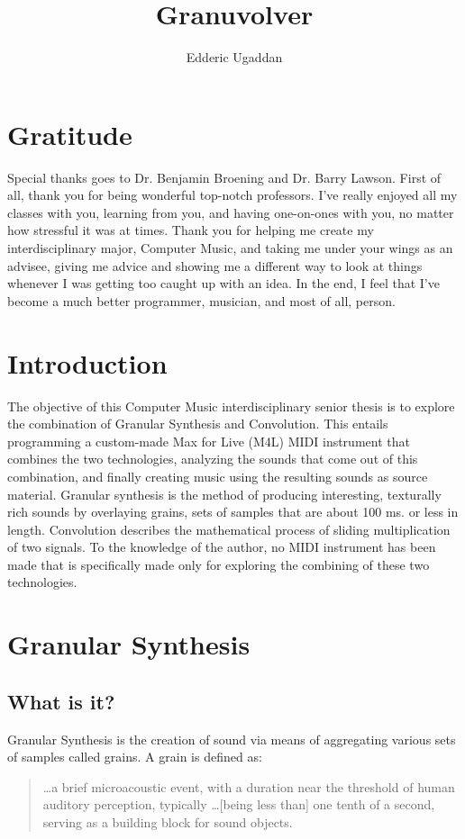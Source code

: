 \documentclass{article}
\author{Edderic Ugaddan}
\title{Granuvolver}
\begin{document}
	\maketitle
	\tableofcontents
	\section{Gratitude}

	Special thanks goes to Dr. Benjamin Broening and Dr. Barry Lawson. First of all, thank you for being wonderful top-notch professors. I've really enjoyed all my classes with you, learning from you, and having one-on-ones with you, no matter how stressful it was at times. Thank you for helping me create my interdisciplinary major, Computer Music, and taking me under your wings as an advisee, giving me advice and showing me a different way to look at things whenever I was getting too caught up with an idea.  In the end, I feel that I've become a much better programmer, musician, and most of all, person.

	\section{Introduction}

	The objective of this Computer Music interdisciplinary senior thesis is to explore the combination of Granular Synthesis and Convolution. This entails programming a custom-made Max for Live (M4L) MIDI instrument that combines the two technologies, analyzing the sounds that come out of this combination, and finally creating music using the resulting sounds as source material. Granular synthesis is the method of producing interesting, texturally rich sounds by overlaying grains, sets of samples that are about 100 ms. or less in length. Convolution describes the mathematical process of sliding multiplication of two signals.   To the knowledge of the author, no MIDI instrument has been made that is specifically made only for exploring the combining of these two technologies.


	\section{Granular Synthesis}
		\subsection{What is it?}
			Granular Synthesis is the creation of sound via means of aggregating various sets of samples called grains. A grain is defined as:
			\begin{quote} 
				\ldots a brief microacoustic event, with a duration near the threshold of human auditory perception, typically \ldots [being less than] one tenth of a second, serving as a building block for sound objects.\cite[Loc. 1024]{Curtis_gs_def} 
			\end{quote}
\end{document}
